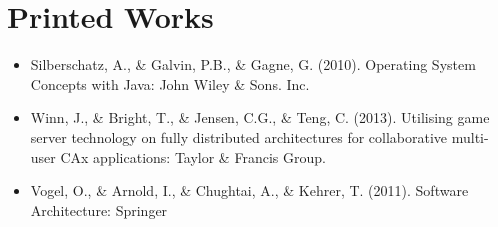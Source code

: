 

\section{Printed Works}
\begin{itemize}
	\item Silberschatz, A., \& Galvin, P.B., \& Gagne, G. (2010).
   Operating System Concepts with Java: John Wiley \& Sons. Inc.
   \item Winn, J., \& Bright, T., \& Jensen, C.G., \& Teng, C. (2013). Utilising game server technology on fully distributed architectures for collaborative multi-user CAx applications: Taylor \& Francis Group.
   \item Vogel, O., \& Arnold, I., \& Chughtai, A., \& Kehrer, T. (2011). Software Architecture: Springer
\end{itemize}


